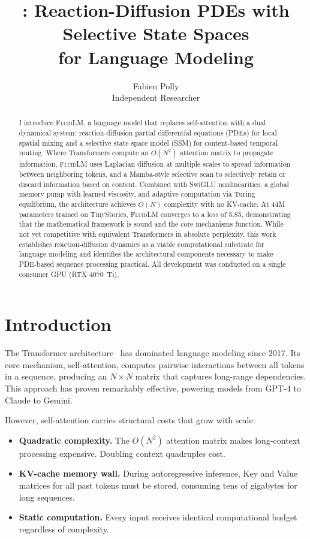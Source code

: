 \documentclass{article}
\title{\fluidlm{}: Reaction-Diffusion PDEs with Selective State Spaces\\for Language Modeling}
\author{
  Fabien Polly \\
  Independent Researcher \\
}
\newcommand{\fluidlm}{\textsc{FluidLM}}
\begin{document}
\maketitle

\begin{abstract}
I introduce \fluidlm{}, a language model that replaces self-attention with a dual dynamical system: reaction-diffusion partial differential equations (PDEs) for local spatial mixing and a selective state space model (SSM) for content-based temporal routing. Where Transformers compute an $O(N^2)$ attention matrix to propagate information, \fluidlm{} uses Laplacian diffusion at multiple scales to spread information between neighboring tokens, and a Mamba-style selective scan to selectively retain or discard information based on content. Combined with SwiGLU nonlinearities, a global memory pump with learned viscosity, and adaptive computation via Turing equilibrium, the architecture achieves $O(N)$ complexity with no KV-cache. At 44M parameters trained on TinyStories, \fluidlm{} converges to a loss of 5.85, demonstrating that the mathematical framework is sound and the core mechanisms function. While not yet competitive with equivalent Transformers in absolute perplexity, this work establishes reaction-diffusion dynamics as a viable computational substrate for language modeling and identifies the architectural components necessary to make PDE-based sequence processing practical. All development was conducted on a single consumer GPU (RTX 4070~Ti).
\end{abstract}

\section{Introduction}

The Transformer architecture~\cite{vaswani2017attention} has dominated language modeling since 2017. Its core mechanism, self-attention, computes pairwise interactions between all tokens in a sequence, producing an $N \times N$ matrix that captures long-range dependencies. This approach has proven remarkably effective, powering models from GPT-4 to Claude to Gemini.

However, self-attention carries structural costs that grow with scale:
\begin{itemize}
    \item \textbf{Quadratic complexity.} The $O(N^2)$ attention matrix makes long-context processing expensive. Doubling context quadruples cost.
    \item \textbf{KV-cache memory wall.} During autoregressive inference, Key and Value matrices for all past tokens must be stored, consuming tens of gigabytes for long sequences.
    \item \textbf{Static computation.} Every input receives identical computational budget regardless of complexity.
\end{itemize}
\end{document}
